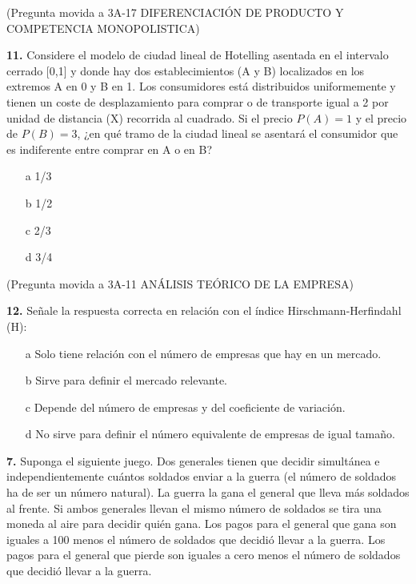 \documentclass{nuevotema}
\begin{document}


(Pregunta movida a 3A-17 DIFERENCIACIÓN DE PRODUCTO Y COMPETENCIA MONOPOLISTICA)

\textbf{11.} Considere el modelo de ciudad lineal de Hotelling asentada en el intervalo cerrado [0,1] y donde hay dos establecimientos (A y B) localizados en los extremos A en 0 y B en 1. Los consumidores está distribuidos uniformemente y tienen un coste de desplazamiento para comprar o de transporte igual a 2 por unidad de distancia (X) recorrida al cuadrado.
Si el precio $P(A)=1$ y el precio de $P(B)=3$, ¿en qué tramo de la ciudad lineal se asentará el consumidor que es indiferente entre comprar en A o en B?

\begin{enumerate}
	\item[a] 1/3
	\item[b] 1/2
	\item[c] 2/3
	\item[d] 3/4
\end{enumerate}


(Pregunta movida a 3A-11 ANÁLISIS TEÓRICO DE LA EMPRESA)

\textbf{12.} Señale la respuesta correcta en relación con el índice Hirschmann-Herfindahl (H):
\begin{enumerate}
	\item[a] Solo tiene relación con el número de empresas que hay en un mercado.
	\item[b] Sirve para definir el mercado relevante.
	\item[c] Depende del número de empresas y del coeficiente de variación.
	\item[d] No sirve para definir el número equivalente de empresas de igual tamaño.
\end{enumerate}



\textbf{7.} Suponga el siguiente juego. Dos generales tienen que decidir simultánea e independientemente cuántos soldados enviar a la guerra (el número de soldados ha de ser un número natural). La guerra la gana el general que lleva más soldados al frente. Si ambos generales llevan el mismo número de soldados se tira una moneda al aire para decidir quién gana. Los pagos para el general que gana son iguales a 100 menos el número de soldados que decidió llevar a la guerra. Los pagos para el general que pierde son iguales a cero menos el número de soldados que decidió llevar a la guerra. 
\end{document}
